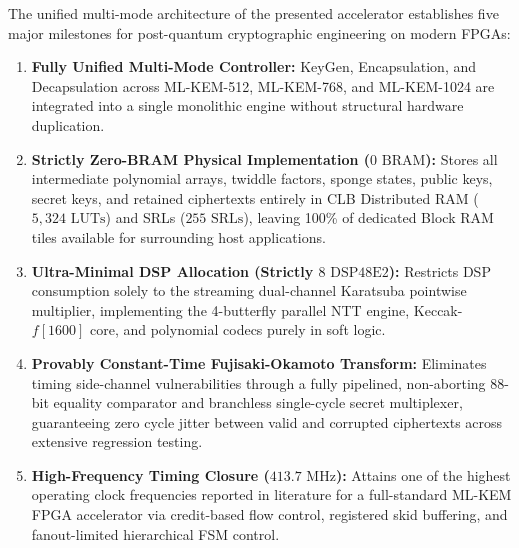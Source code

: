 The unified multi-mode architecture of the presented accelerator establishes five major milestones for post-quantum cryptographic engineering on modern FPGAs:
\begin{enumerate}
    \item \textbf{Fully Unified Multi-Mode Controller:} KeyGen, Encapsulation, and Decapsulation across \mbox{ML-KEM-512}, \mbox{ML-KEM-768}, and \mbox{ML-KEM-1024} are integrated into a single monolithic engine without structural hardware duplication.
    \item \textbf{Strictly Zero-BRAM Physical Implementation ($0\text{ BRAM}$):} Stores all intermediate polynomial arrays, twiddle factors, sponge states, public keys, secret keys, and retained ciphertexts entirely in CLB Distributed RAM ($5,324\text{ LUTs}$) and SRLs ($255\text{ SRLs}$), leaving 100\% of dedicated Block RAM tiles available for surrounding host applications.
    \item \textbf{Ultra-Minimal DSP Allocation (Strictly $8\text{ DSP48E2}$):} Restricts DSP consumption solely to the streaming dual-channel Karatsuba pointwise multiplier, implementing the 4-butterfly parallel NTT engine, Keccak-$f[1600]$ core, and polynomial codecs purely in soft logic.
    \item \textbf{Provably Constant-Time Fujisaki-Okamoto Transform:} Eliminates timing side-channel vulnerabilities through a fully pipelined, non-aborting 88-bit equality comparator and branchless single-cycle secret multiplexer, guaranteeing zero cycle jitter between valid and corrupted ciphertexts across extensive regression testing.
    \item \textbf{High-Frequency Timing Closure ($413.7\text{ MHz}$):} Attains one of the highest operating clock frequencies reported in literature for a full-standard \mbox{ML-KEM} FPGA accelerator via credit-based flow control, registered skid buffering, and fanout-limited hierarchical FSM control.
\end{enumerate}

